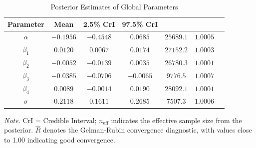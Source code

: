 \documentclass[11pt]{article}
\begin{document}
	\begin{table}[H]
		\centering
		\caption{Posterior Estimates of Global Parameters}
		\renewcommand{\arraystretch}{1.3}
		\begin{tabular}{ccccccc}
			\hline
			\textbf{Parameter} & \textbf{Mean} & \textbf{2.5\% CrI } & \textbf{97.5\% CrI } & \boldmath{$n_\text{eff}$} & \boldmath{$\hat{R}$} \\
			\hline
			$\alpha$   & $-0.1956$ & $-0.4548$ & $0.0685$ & $25689.1$ & $1.0005$ \\
			$\beta_1$  & $0.0120$ & $0.0067$  & $0.0174$ & $27152.2$ & $1.0003$ \\
			$\beta_2$  & $-0.0052$ & $-0.0139$ & $0.0035$ & $26780.3$ & $1.0001$ \\
			$\beta_3$  & $-0.0385$ & $-0.0706$ & $-0.0065$ & $9776.5$ & $1.0007$ \\
			$\beta_4$  & $0.0089$ & $-0.0014$ & $0.0190$ & $28092.1$ & $1.0001$ \\
			$\sigma$   & $0.2118$ & $0.1611$  & $0.2685$ & $7507.3$ & $1.0006$ \\
			\hline
		\end{tabular}
		\vspace{0.5em}
		\begin{minipage}{0.95\textwidth}
			\footnotesize
			\textit{Note.} CrI = Credible Interval; $n_\text{eff}$ indicates the effective sample size from the posterior. $\hat{R}$ denotes the Gelman-Rubin convergence diagnostic, with values close to 1.00 indicating good convergence.
		\end{minipage}
		\label{tab:icar_results}
	\end{table}
%	
%	
%	
%	
\end{document}
